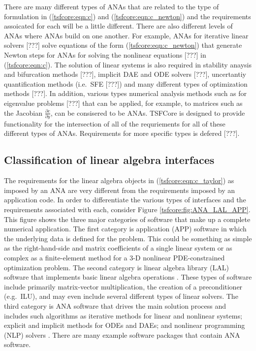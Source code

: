 \documentclass[10pt,fleqn]{article}
\begin{document}
There are many different types of ANAs that are related to the type of
formulation in (\ref{tsfcore:eqn:c}) and (\ref{tsfcore:eqn:c_newton})
and the requirements assoicated for each will be a little different.
There are also different levels of ANAs where ANAs build on one
another.  For example, ANAs for iterative linear solvers [???] solve
equations of the form (\ref{tsfcore:eqn:c_newton}) that generate
Newton steps for ANAs for solving the nonlinear equations [???] in
(\ref{tsfcore:eqn:c}).  The solution of linear systems is also
required in stability anaysis and bifurcation methods [???], implicit
DAE and ODE solvers [???], uncertantiy quantification methods
(i.e.~SFE [???]) and many different types of optimization methods
[???].  In addition, various types numerical analysis methods such as
for eigenvalue problems [???] that can be applied, for example, to
matrices such as the Jacobian $\frac{\partial c}{\partial y}$, can be
consisered to be ANAs.  TSFCore is designed to provide functionality
for the intersection of all of the requriements for all of these
different types of ANAs.  Requirements for more specific types is
defered [???].

%
\subsection{Classification of linear algebra interfaces}
\label{tsfcore:sec:classification_of_lin_alg_itfc}
%

The requirements for the linear algebra objects in
(\ref{tsfcore:eqn:c_taylor}) as imposed by
an ANA are very different from the requirements imposed by an
application code.  In order to differentiate the various types of
interfaces and the requirements associated with each, consider Figure
\ref{tsfcore:fig:ANA_LAL_APP}.  This figure shows the three major
categories of software that make up a complete numerical application.
The first category is application (APP) software in which the
underlying data is defined for the problem.  This could be something
as simple as the right-hand-side and matrix coefficients of a single
linear system or as complex as a finite-element method for a 3-D
nonlinear PDE-constrained optimization problem.  The second category
is linear algebra library (LAL) software that implements basic linear
algebra operations \cite{ref:demmel_1997,ref:anderson_1995,
ref:blackford_et_al_1997, ref:aztec, ref:petsc, ref:trilinos}. These
types of software include primarily matrix-vector multiplication, the
creation of a preconditioner (e.g.~ILU), and may even include several
different types of linear solvers.  The third category is ANA software
that drives the main solution process and includes such algorithms as
iterative methods for linear and nonlinear systems; explicit and
implicit methods for ODEs and DAEs; and nonlinear programming (NLP)
solvers \cite{ref:nocedal_wright_1999}.  There are many example
software packages
\cite{ref:petsc,ref:aztec,ref:trilinos,ref:pvode,ref:tao} that contain
ANA software.
\end{document}
